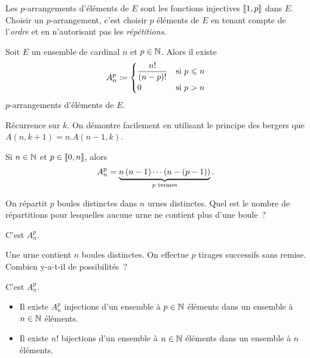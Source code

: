 \documentclass{magnolia}
\begin{document}
\begin{remarques}
\remarque Les $p$-arrangements d'éléments de $E$ sont les fonctions injectives $\left\llbracket 1,p\right\rrbracket$ dans $E$.
\remarque Choisir un $p$-arrangement, c'est choisir $p$ éléments de $E$ en tenant
  compte de  l'\emph{ordre} et en n'autorisant pas les \emph{répétitions}.
\end{remarques}

\begin{proposition}[nom={Nombre d'arrangements}]
Soit $E$ un ensemble de cardinal $n$ et $p\in\mathbb{N}$. Alors il existe
\[A_n^p\coloneqq
  \begin{cases}
  \displaystyle\frac{n!}{\left(n-p\right)!} & \text{si $p\leqslant n$}\\
  0 & \text{si $p>n$}
  \end{cases}\]
  $p$-arrangements d'éléments de $E$.
\end{proposition}

\begin{preuve}
Récurrence sur $k$. On démontre facilement en utilisant le principe des bergers
que $A(n,k+1)=n.A(n-1,k)$.
\end{preuve}

\begin{remarqueUnique}
\remarque Si $n\in\mathbb{N}$ et $p\in\left\llbracket 0,n\right\rrbracket$, alors
  \[A_n^p = \underbrace{n\left(n-1\right)\cdots\left(n-(p-1)\right)}_{\text{$p$ termes}}.\]
\end{remarqueUnique}

\begin{exos}
\exo On répartit $p$ boules distinctes dans $n$ urnes distinctes. Quel est
  le nombre de répartitions pour lesquelles aucune urne ne contient plus d'une
  boule~?
  \begin{sol}
  C'est $A_n^p$.
  \end{sol}
\exo Une urne contient $n$ boules distinctes. On effectue $p$ tirages
  successifs sans remise. Combien y-a-t-il de possibilités~?
  \begin{sol}
  C'est $A_n^p$.
  \end{sol}
\end{exos}

\begin{proposition}
\begin{itemize}
\item Il existe $A_n^p$ injections d'un ensemble à $p\in\mathbb{N}$ éléments dans un ensemble à $n\in\mathbb{N}$ éléments.
\item Il existe $n!$ bijections d'un ensemble à $n\in\mathbb{N}$ éléments dans un ensemble à $n$ éléments.
\end{itemize}
\end{proposition}
\end{document}
